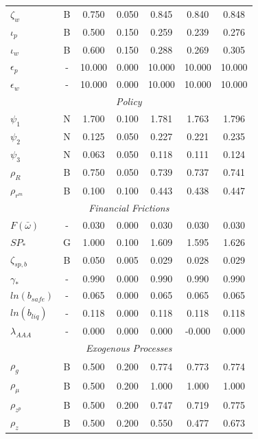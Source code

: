 \documentclass[12pt]{article}
\begin{document}
{\begin{longtable}{lcccccc}
$\zeta_w$ & B &    0.750 &    0.050 &    0.845 &    0.840 &    0.848 \\
$\iota_p$ & B &    0.500 &    0.150 &    0.259 &    0.239 &    0.276 \\
$\iota_w$ & B &    0.600 &    0.150 &    0.288 &    0.269 &    0.305 \\
$\epsilon_{p}$ & - &   10.000 &    0.000 &   10.000 &   10.000 &   10.000 \\
$\epsilon_{w}$ & - &   10.000 &    0.000 &   10.000 &   10.000 &   10.000 \\
\multicolumn{7}{c}{\textit{Policy}} \\[3pt]
$\psi_1$ & N &    1.700 &    0.100 &    1.781 &    1.763 &    1.796 \\
$\psi_2$ & N &    0.125 &    0.050 &    0.227 &    0.221 &    0.235 \\
$\psi_3$ & N &    0.063 &    0.050 &    0.118 &    0.111 &    0.124 \\
$\rho_R$ & B &    0.750 &    0.050 &    0.739 &    0.737 &    0.741 \\
$\rho_{r^m}$ & B &    0.100 &    0.100 &    0.443 &    0.438 &    0.447 \\
\multicolumn{7}{c}{\textit{Financial Frictions}} \\[3pt]
$F(\bar{\omega})$ & - &    0.030 &    0.000 &    0.030 &    0.030 &    0.030 \\
$SP_*$ & G &    1.000 &    0.100 &    1.609 &    1.595 &    1.626 \\
$\zeta_{sp,b}$ & B &    0.050 &    0.005 &    0.029 &    0.028 &    0.029 \\
$\gamma_*$ & - &    0.990 &    0.000 &    0.990 &    0.990 &    0.990 \\
$ln(b_{safe})$ & - &    0.065 &    0.000 &    0.065 &    0.065 &    0.065 \\
$ln(b_{liq})$ & - &    0.118 &    0.000 &    0.118 &    0.118 &    0.118 \\
$\lambda_{AAA}$ & - &    0.000 &    0.000 &    0.000 &   -0.000 &    0.000 \\
\multicolumn{7}{c}{\textit{Exogenous Processes}} \\[3pt]
$\rho_g$ & B &    0.500 &    0.200 &    0.774 &    0.773 &    0.774 \\
$\rho_{\mu}$ & B &    0.500 &    0.200 &    1.000 &    1.000 &    1.000 \\
$\rho_{z^p}$ & B &    0.500 &    0.200 &    0.747 &    0.719 &    0.775 \\
$\rho_z$ & B &    0.500 &    0.200 &    0.550 &    0.477 &    0.673 \\

\end{longtable}}
\end{document}
